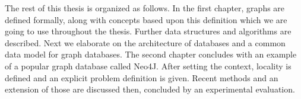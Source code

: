 The rest of this thesis is organized as follows.
In the first chapter, graphs are defined formally, along with concepts based upon this definition which we are going to use throughout the thesis. 
Further data structures and algorithms are described.
Next we elaborate on the architecture of databases and a common data model for graph databases. The second chapter concludes with an example of a popular graph database called Neo4J.
After setting the context, locality is defined and an explicit problem definition is given.
Recent methods and an extension of those are discussed then, concluded by an experimental evaluation.
